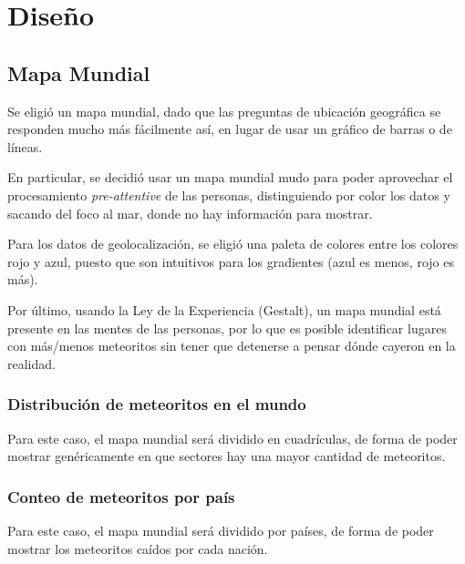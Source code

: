 \documentclass[letterpaper,10pt]{article}
\begin{document}
	\newpage

	\section{Diseño}

	\subsection{Mapa Mundial}

	Se eligió un mapa mundial, dado que las preguntas de ubicación geográfica se responden mucho más fácilmente así, en lugar de usar un gráfico de barras o de líneas.

	En particular, se decidió usar un mapa mundial mudo para poder aprovechar el procesamiento \textit{pre-attentive} de las personas, distinguiendo por color los datos y sacando del
	foco al mar, donde no hay información para mostrar.

	Para los datos de geolocalización, se eligió una paleta de colores entre los colores rojo y azul, puesto que son intuitivos para los gradientes (azul es menos, rojo es más).

	Por último, usando la Ley de la Experiencia (Gestalt), un mapa mundial está presente en las mentes de las personas, por lo que es posible identificar lugares con más/menos meteoritos
	sin tener que detenerse a pensar dónde cayeron en la realidad.

	\subsubsection{Distribución de meteoritos en el mundo}

	Para este caso, el mapa mundial será dividido en cuadrículas, de forma de poder mostrar genéricamente en que sectores hay una mayor cantidad de meteoritos.

	\subsubsection{Conteo de meteoritos por país}

	Para este caso, el mapa mundial será dividido por países, de forma de poder mostrar los meteoritos caídos por cada nación.
\end{document}
